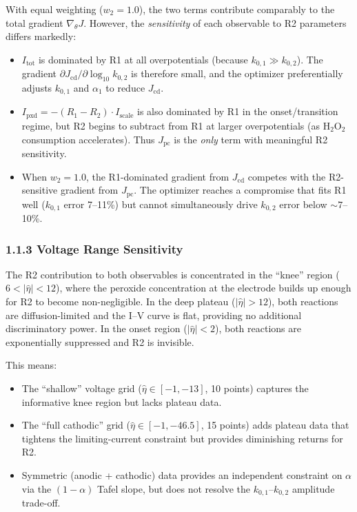 \documentclass[11pt]{article}
\begin{document}
With equal weighting ($w_2 = 1.0$), the two terms contribute comparably to the
total gradient $\nabla_\theta J$.  However, the \emph{sensitivity} of each
observable to R2 parameters differs markedly:
\begin{itemize}
  \item $I_{\text{tot}}$ is dominated by R1 at all overpotentials (because
        $k_{0,1} \gg k_{0,2}$).  The gradient $\partial J_{\text{cd}} / \partial
        \log_{10} k_{0,2}$ is therefore small, and the optimizer preferentially
        adjusts $k_{0,1}$ and $\alpha_1$ to reduce $J_{\text{cd}}$.

  \item $I_{\text{pxd}} = -(R_1 - R_2) \cdot I_{\text{scale}}$ is also dominated
        by R1 in the onset/transition regime, but R2 begins to subtract from R1
        at larger overpotentials (as H$_2$O$_2$ consumption accelerates).  Thus
        $J_{\text{pc}}$ is the \emph{only} term with meaningful R2 sensitivity.

  \item When $w_2 = 1.0$, the R1-dominated gradient from $J_{\text{cd}}$ competes
        with the R2-sensitive gradient from $J_{\text{pc}}$.  The optimizer reaches
        a compromise that fits R1 well ($k_{0,1}$ error 7--11\%) but cannot
        simultaneously drive $k_{0,2}$ error below ${\sim}7$--10\%.
\end{itemize}

\subsubsection*{1.1.3 Voltage Range Sensitivity}

The R2 contribution to both observables is concentrated in the ``knee'' region
($6 < |\hat\eta| < 12$), where the peroxide concentration at the electrode
builds up enough for R2 to become non-negligible.  In the deep plateau
($|\hat\eta| > 12$), both reactions are diffusion-limited and the I--V curve
is flat, providing no additional discriminatory power.  In the onset region
($|\hat\eta| < 2$), both reactions are exponentially suppressed and R2 is
invisible.

This means:
\begin{itemize}
  \item The ``shallow'' voltage grid ($\hat\eta \in [-1, -13]$, 10 points)
        captures the informative knee region but lacks plateau data.
  \item The ``full cathodic'' grid ($\hat\eta \in [-1, -46.5]$, 15 points)
        adds plateau data that tightens the limiting-current constraint but
        provides diminishing returns for R2.
  \item Symmetric (anodic + cathodic) data provides an independent constraint
        on $\alpha$ via the $(1-\alpha)$ Tafel slope, but does not resolve the
        $k_{0,1}$--$k_{0,2}$ amplitude trade-off.
\end{itemize}
\end{document}
